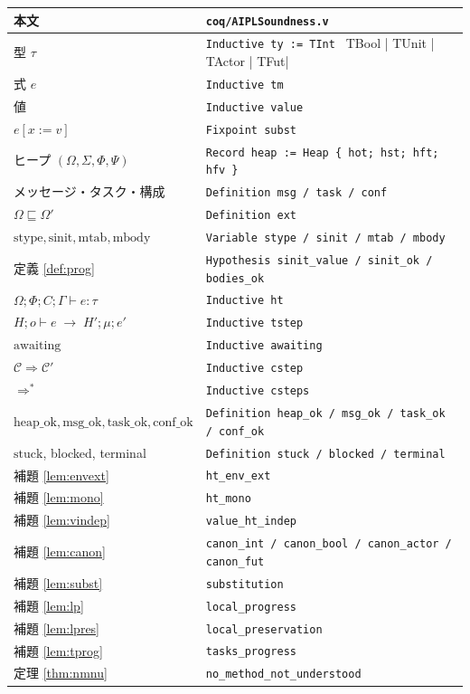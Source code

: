 \documentclass[11pt,a4paper]{ltjsarticle}
\theoremstyle{definition}
\theoremstyle{remark}
\newcommand{\Om}{\Omega}          %
\newcommand{\Sm}{\Sigma}          %
\newcommand{\Ph}{\Phi}            %
\newcommand{\Ps}{\Psi}            %
\newcommand{\jt}[3]{\Om;\Ph;#1;#2 \vdash #3}
\newcommand{\mtab}{\mathrm{mtab}}
\newcommand{\stype}{\mathrm{stype}}
\newcommand{\sinit}{\mathrm{sinit}}
\newcommand{\mbody}{\mathrm{mbody}}
\newcommand{\subs}[2]{[#1 := #2]}
\newcommand{\tstep}[6]{#1; #2 \vdash #3 \;\longrightarrow\; #4; #5; #6}
\newcommand{\cstep}{\Longrightarrow}
\newcommand{\heapok}{\mathrm{heap\_ok}}
\newcommand{\msgok}{\mathrm{msg\_ok}}
\newcommand{\taskok}{\mathrm{task\_ok}}
\newcommand{\confok}{\mathrm{conf\_ok}}
\newcommand{\awaiting}{\mathrm{awaiting}}
\newcommand{\stuck}{\mathrm{stuck}}
\begin{document}
\begin{center}
\begin{longtable}{@{}ll@{}}
\toprule
本文 & \texttt{coq/AIPLSoundness.v} \\
\midrule
\endhead
型 $\tau$ & \verb|Inductive ty := TInt | TBool | TUnit | TActor | TFut| \\
式 $e$ & \verb|Inductive tm| \\
値 & \verb|Inductive value| \\
$e\subs{x}{v}$ & \verb|Fixpoint subst| \\
ヒープ $(\Om,\Sm,\Ph,\Ps)$ & \verb|Record heap := Heap { hot; hst; hft; hfv }| \\
メッセージ・タスク・構成 & \verb|Definition msg / task / conf| \\
$\Om \sqsubseteq \Om'$ & \verb|Definition ext| \\
$\stype,\sinit,\mtab,\mbody$ & \verb|Variable stype / sinit / mtab / mbody| \\
定義 \ref{def:prog} & \verb|Hypothesis sinit_value / sinit_ok / bodies_ok| \\
$\jt{C}{\Gamma}{e : \tau}$ & \verb|Inductive ht| \\
$\tstep{H}{o}{e}{H'}{\mu}{e'}$ & \verb|Inductive tstep| \\
$\awaiting$ & \verb|Inductive awaiting| \\
$\mathcal{C} \cstep \mathcal{C}'$ & \verb|Inductive cstep| \\
$\cstep^{*}$ & \verb|Inductive csteps| \\
$\heapok,\msgok,\taskok,\confok$ & \verb|Definition heap_ok / msg_ok / task_ok / conf_ok| \\
$\stuck$, blocked, terminal & \verb|Definition stuck / blocked / terminal| \\
補題 \ref{lem:envext} & \verb|ht_env_ext| \\
補題 \ref{lem:mono} & \verb|ht_mono| \\
補題 \ref{lem:vindep} & \verb|value_ht_indep| \\
補題 \ref{lem:canon} & \verb|canon_int / canon_bool / canon_actor / canon_fut| \\
補題 \ref{lem:subst} & \verb|substitution| \\
補題 \ref{lem:lp} & \verb|local_progress| \\
補題 \ref{lem:lpres} & \verb|local_preservation| \\
補題 \ref{lem:tprog} & \verb|tasks_progress| \\
定理 \ref{thm:nmnu} & \verb|no_method_not_understood| \\

\end{longtable}
\end{center}
\end{document}
